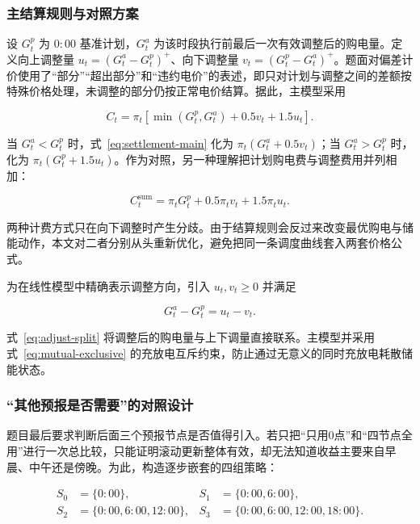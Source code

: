 \subsubsection{主结算规则与对照方案}
\label{sec:settlement}

设 $G^p_t$ 为 $0{:}00$ 基准计划，$G^a_t$ 为该时段执行前最后一次有效调整后的购电量。定义向上调整量 $u_t=(G^a_t-G^p_t)^+$、向下调整量 $v_t=(G^p_t-G^a_t)^+$。题面对偏差计价使用了“部分”“超出部分”和“违约电价”的表述，即只对计划与调整之间的差额按特殊价格处理，未调整的部分仍按正常电价结算。据此，主模型采用

\begin{equation}
    C_t=\pi_t\left[\min(G^p_t,G^a_t)+0.5v_t+1.5u_t\right].
    \label{eq:settlement-main}
\end{equation}

当 $G^a_t<G^p_t$ 时，式~\eqref{eq:settlement-main} 化为 $\pi_t(G^a_t+0.5v_t)$；当 $G^a_t>G^p_t$ 时，化为 $\pi_t(G^p_t+1.5u_t)$。作为对照，另一种理解把计划购电费与调整费用并列相加：

\begin{equation}
    C_t^{\text{sum}}=\pi_tG^p_t+0.5\pi_tv_t+1.5\pi_tu_t .
    \label{eq:settlement-sum}
\end{equation}

两种计费方式只在向下调整时产生分歧。由于结算规则会反过来改变最优购电与储能动作，本文对二者分别从头重新优化，避免把同一条调度曲线套入两套价格公式。

为在线性模型中精确表示调整方向，引入 $u_t,v_t\ge0$ 并满足

\begin{equation}
    G^a_t-G^p_t=u_t-v_t .
    \label{eq:adjust-split}
\end{equation}

式~\eqref{eq:adjust-split} 将调整后的购电量与上下调量直接联系。主模型并采用式~\eqref{eq:mutual-exclusive} 的充放电互斥约束，防止通过无意义的同时充放电耗散储能状态。

\subsubsection{“其他预报是否需要”的对照设计}

题目最后要求判断后面三个预报节点是否值得引入。若只把“只用0点”和“四节点全用”进行一次总比较，只能证明滚动更新整体有效，却无法知道收益主要来自早晨、中午还是傍晚。为此，构造逐步嵌套的四组策略：

\begin{equation}
    \begin{aligned}
        S_0&=\{0{:}00\}, & S_1&=\{0{:}00,6{:}00\},\\
        S_2&=\{0{:}00,6{:}00,12{:}00\}, &
        S_3&=\{0{:}00,6{:}00,12{:}00,18{:}00\}.
    \end{aligned}
    \label{eq:q3-nodes}
\end{equation}

